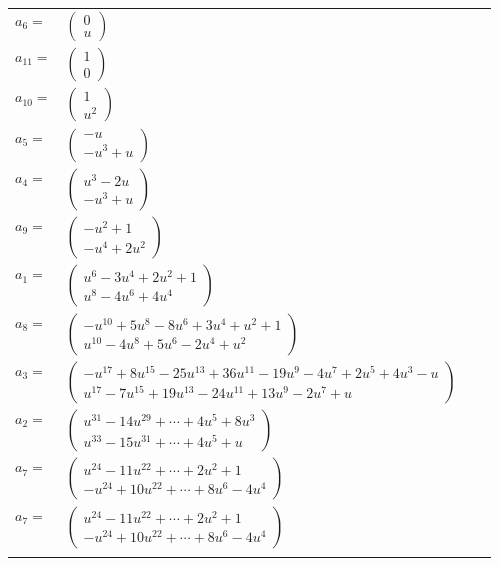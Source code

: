 \documentclass[1p]{elsarticle_modified}
\theoremstyle{definition}
\begin{document}
\begin{tabular}{m{7pt} m{180pt} m{7pt} m{180pt} }
\flushright $a_{6}=$&$\begin{pmatrix}0\\u\end{pmatrix}$ \\
\flushright $a_{11}=$&$\begin{pmatrix}1\\0\end{pmatrix}$ \\
\flushright $a_{10}=$&$\begin{pmatrix}1\\u^2\end{pmatrix}$ \\
\flushright $a_{5}=$&$\begin{pmatrix}- u\\- u^3+u\end{pmatrix}$ \\
\flushright $a_{4}=$&$\begin{pmatrix}u^3-2 u\\- u^3+u\end{pmatrix}$ \\
\flushright $a_{9}=$&$\begin{pmatrix}- u^2+1\\- u^4+2 u^2\end{pmatrix}$ \\
\flushright $a_{1}=$&$\begin{pmatrix}u^6-3 u^4+2 u^2+1\\u^8-4 u^6+4 u^4\end{pmatrix}$ \\
\flushright $a_{8}=$&$\begin{pmatrix}- u^{10}+5 u^8-8 u^6+3 u^4+u^2+1\\u^{10}-4 u^8+5 u^6-2 u^4+u^2\end{pmatrix}$ \\
\flushright $a_{3}=$&$\begin{pmatrix}- u^{17}+8 u^{15}-25 u^{13}+36 u^{11}-19 u^9-4 u^7+2 u^5+4 u^3- u\\u^{17}-7 u^{15}+19 u^{13}-24 u^{11}+13 u^9-2 u^7+u\end{pmatrix}$ \\
\flushright $a_{2}=$&$\begin{pmatrix}u^{31}-14 u^{29}+\cdots+4 u^5+8 u^3\\u^{33}-15 u^{31}+\cdots+4 u^5+u\end{pmatrix}$ \\
\flushright $a_{7}=$&$\begin{pmatrix}u^{24}-11 u^{22}+\cdots+2 u^2+1\\- u^{24}+10 u^{22}+\cdots+8 u^6-4 u^4\end{pmatrix}$\\ \flushright $a_{7}=$&$\begin{pmatrix}u^{24}-11 u^{22}+\cdots+2 u^2+1\\- u^{24}+10 u^{22}+\cdots+8 u^6-4 u^4\end{pmatrix}$\\&\end{tabular}
\end{document}
